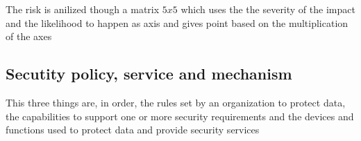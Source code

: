 \documentclass[12pt, a4paper]{article}
\begin{document}
The risk is anilized though a matrix $5x5$ which uses the the severity of the impact and the likelihood to happen as axis and gives point based on the
multiplication of the axes

\subsection{Secutity policy, service and mechanism}
This three things are, in order, the rules set by an organization to protect data, the capabilities to support one or more security requirements and the
devices and functions used to protect data and provide security services
\end{document}
